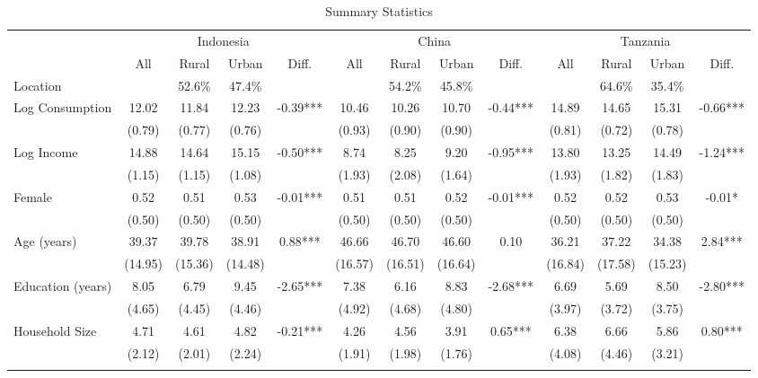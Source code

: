 \begin{table}[htbp] \centering \caption{Summary Statistics}\label{tab:summary_stats_combined_unb}
\begin{threeparttable}
\begin{tabular}{l cccc cccc cccc} \toprule
& \multicolumn{4}{c}{Indonesia} & \multicolumn{4}{c}{China} & \multicolumn{4}{c}{Tanzania} \\
\cmidrule(lr){2-5} \cmidrule(lr){6-9} \cmidrule(lr){10-13}
& All & Rural & Urban & Diff. & All & Rural & Urban & Diff. & All & Rural & Urban & Diff. \\
Location &  &   52.6\% &   47.4\% &  &  &   54.2\% &   45.8\% &  &  &   64.6\% &   35.4\% &  \\  \addlinespace \addlinespace
Log Consumption & 12.02 & 11.84 & 12.23 & -0.39*** & 10.46 & 10.26 & 10.70 & -0.44*** & 14.89 & 14.65 & 15.31 & -0.66*** \\
 & (0.79) & (0.77) & (0.76) &  & (0.93) & (0.90) & (0.90) &  & (0.81) & (0.72) & (0.78) &  \\  \addlinespace
Log Income & 14.88 & 14.64 & 15.15 & -0.50*** & 8.74 & 8.25 & 9.20 & -0.95*** & 13.80 & 13.25 & 14.49 & -1.24*** \\
 & (1.15) & (1.15) & (1.08) &  & (1.93) & (2.08) & (1.64) &  & (1.93) & (1.82) & (1.83) &  \\  \addlinespace
Female & 0.52 & 0.51 & 0.53 & -0.01*** & 0.51 & 0.51 & 0.52 & -0.01*** & 0.52 & 0.52 & 0.53 & -0.01* \\
 & (0.50) & (0.50) & (0.50) &  & (0.50) & (0.50) & (0.50) &  & (0.50) & (0.50) & (0.50) &  \\  \addlinespace
Age (years) & 39.37 & 39.78 & 38.91 & 0.88*** & 46.66 & 46.70 & 46.60 & 0.10 & 36.21 & 37.22 & 34.38 & 2.84*** \\
 & (14.95) & (15.36) & (14.48) &  & (16.57) & (16.51) & (16.64) &  & (16.84) & (17.58) & (15.23) &  \\  \addlinespace
Education (years) & 8.05 & 6.79 & 9.45 & -2.65*** & 7.38 & 6.16 & 8.83 & -2.68*** & 6.69 & 5.69 & 8.50 & -2.80*** \\
 & (4.65) & (4.45) & (4.46) &  & (4.92) & (4.68) & (4.80) &  & (3.97) & (3.72) & (3.75) &  \\  \addlinespace
Household Size & 4.71 & 4.61 & 4.82 & -0.21*** & 4.26 & 4.56 & 3.91 & 0.65*** & 6.38 & 6.66 & 5.86 & 0.80*** \\
 & (2.12) & (2.01) & (2.24) &  & (1.91) & (1.98) & (1.76) &  & (4.08) & (4.46) & (3.21) &  \\  \addlinespace

\end{tabular}
\end{threeparttable}
\end{table}
